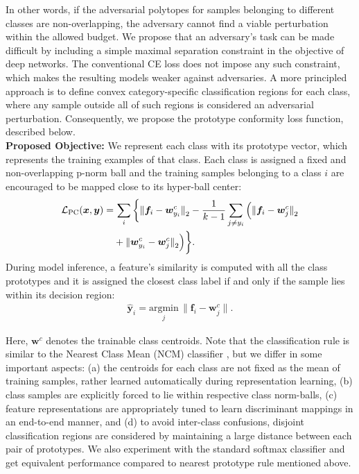 \documentclass[10pt,twocolumn,letterpaper]{article}
\begin{document}
In other words, if the adversarial polytopes for samples belonging to different classes are non-overlapping, the adversary cannot find a viable perturbation within the allowed budget. We propose that an adversary's task can be made difficult by including a simple maximal separation constraint in the objective of deep networks. The conventional CE loss does not impose any such constraint, which makes the resulting models weaker against adversaries.
A more principled approach is to define convex category-specific classification regions for each class, where any sample outside all of such regions is considered an adversarial perturbation. Consequently, we propose the prototype conformity loss function, described below. \\

\vspace{-0.5em}
\noindent \textbf{Proposed Objective:} We represent each class with its prototype vector, which represents the training examples of that class.  Each class is assigned a fixed and non-overlapping p-norm ball and the training samples belonging to a class $i$ are encouraged to be mapped close to its hyper-ball center:
\vspace{-0.55em}
\begin{align}
\label{eq:5}
    \mathcal{L}_{\text{PC}}(\bm{x}, \bm{y}) = & \,\sum\limits_{i}\bigg\{ {\parallel}\bm{f}_i - \bm{w}_{y_i}^c{\parallel}_2 - \frac{1}{k-1} \sum\limits_{j\neq y_i}\Big( {\parallel} \bm{f}_i - \bm{w}_j^c{\parallel}_2 \notag\\ 
    & +  {\parallel} \bm{w}_{y_i}^c - \bm{w}_{j}^c{\parallel}_2 \Big) \bigg\}.
\end{align}
During model inference, a feature's similarity is computed with all the class prototypes and it is assigned the closest class label if and only if the sample lies within its decision region: 
\vspace{-0.95em}
\begin{align}
  \hat{\bm{y}}_i = \underset{j}{\text{argmin}} \,{\parallel}\bm{f}_i - \bm{w}_j^c {\parallel}.
\end{align}

Here, $\bm{w}^c$ denotes the trainable class centroids. Note that the classification rule is similar to the Nearest Class Mean (NCM) classifier \cite{mensink2013distance}, but we differ in some important aspects: (a) the centroids for each class are not fixed as the mean of training samples, rather learned automatically during representation learning, (b) class samples are explicitly forced to lie within respective class norm-balls, (c) feature representations are appropriately tuned to learn discriminant mappings in an end-to-end manner, and (d) to avoid inter-class confusions, disjoint classification regions are considered by maintaining a large distance between each pair of prototypes. We also experiment with the standard softmax classifier and get equivalent performance compared to nearest prototype rule mentioned above.
\end{document}
